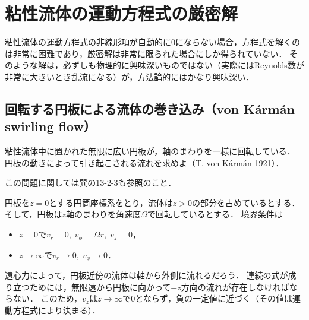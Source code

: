 \section{粘性流体の運動方程式の厳密解}
粘性流体の運動方程式の非線形項が自動的に0にならない場合，方程式を解くのは非常に困難であり，厳密解は非常に限られた場合にしか得られていない．
そのような解は，必ずしも物理的に興味深いものではない（実際にはReynolds数が非常に大きいとき乱流になる）が，方法論的にはかなり興味深い．



\subsection*{回転する円板による流体の巻き込み（von K\'{a}rm\'{a}n swirling flow）}

\begin{myitembox}
粘性流体中に置かれた無限に広い円板が，軸のまわりを一様に回転している．
円板の動きによって引き起こされる流れを求めよ（T. von K\'{a}rm\'{a}n 1921）．
\end{myitembox}
\begin{details}
この問題に関しては巽の13-2-3も参照のこと．
\end{details}

円板を$z=0$とする円筒座標系をとり，流体は$z>0$の部分を占めているとする．
そして，円板は$z$軸のまわりを角速度$\Omega$で回転しているとする．
境界条件は
\begin{itemize}
    \item $z=0$で$v_r = 0, \; v_\phi = \Omega r, \; v_z = 0$，
    \item $z \to \infty$で$v_r \to 0, \; v_\phi \to 0$．
\end{itemize}
遠心力によって，円板近傍の流体は軸から外側に流れるだろう．
連続の式が成り立つためには，無限遠から円板に向かって$-z$方向の流れが存在しなければならない．
このため，$v_z$は$z\to\infty$で0とならず，負の一定値に近づく（その値は運動方程式により決まる）．


